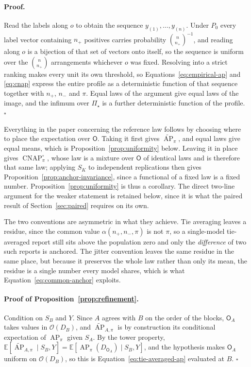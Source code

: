 \documentclass[11pt]{article}
\newcommand{\AP}{\operatorname{AP}}
\newcommand{\CNAP}{\operatorname{CNAP}}
\newcommand{\PSet}{\Pi_\star}
\newcommand{\E}{\mathbb{E}}
\newcommand{\APta}{\widetilde{\AP}}
\newcommand{\Rank}{\mathsf{O}}
\newcommand{\CNAPj}{\CNAP^{\circ}}
\theoremstyle{remark}
\begin{document}
\paragraph{Proof.}
Read the labels along $o$ to obtain the sequence $y_{(1)},\ldots,y_{(n)}$. Under $P_0$ every label vector containing $n_+$ positives carries probability $\binom{n}{n_+}^{-1}$, and reading along $o$ is a bijection of that set of vectors onto itself, so the sequence is uniform over the $\binom{n}{n_+}$ arrangements whichever $o$ was fixed. Resolving into a strict ranking makes every unit its own threshold, so Equations~\eqref{eq:empirical-ap} and \eqref{eq:cnap} express the entire profile as a deterministic function of that sequence together with $n_+$, $n_-$ and $\pi$. Equal laws of the argument give equal laws of the image, and the infimum over $\PSet$ is a further deterministic function of the profile. $\square$

Everything in the paper concerning the reference law follows by choosing where to place the expectation over $\Rank$. Taking it first gives $\APta_\pi$, and equal laws give equal means, which is Proposition~\ref{prop:uniformity} below. Leaving it in place gives $\CNAPj_\pi$, whose law is a mixture over $\Rank$ of identical laws and is therefore that same law; applying $S_K$ to independent replications then gives Proposition~\ref{prop:anchor-invariance}, since a functional of a fixed law is a fixed number. Proposition~\ref{prop:uniformity} is thus a corollary. The direct two-line argument for the weaker statement is retained below, since it is what the paired result of Section~\ref{sec:paired} requires on its own.

The two conventions are asymmetric in what they achieve. Tie averaging leaves a residue, since the common value $\alpha(n_+,n_-,\pi)$ is not $\pi$, so a single-model tie-averaged report still sits above the population zero and only the \emph{difference} of two such reports is anchored. The jitter convention leaves the same residue in the same place, but because it preserves the whole law rather than only its mean, the residue is a single number every model shares, which is what Equation~\eqref{eq:common-anchor} exploits.

\paragraph{Proof of Proposition~\ref{prop:refinement}.}
Condition on $S_B$ and $Y$. Since $A$ agrees with $B$ on the order of the blocks, $\Rank_A$ takes values in $\mathcal{O}(D_B)$, and $\APta_{A,\pi}$ is by construction its conditional expectation of $\AP_\pi$ given $S_A$. By the tower property, $\E[\APta_{A,\pi}\mid S_B,Y]=\E[\AP_\pi(D_{\Rank_A})\mid S_B,Y]$, and the hypothesis makes $\Rank_A$ uniform on $\mathcal{O}(D_B)$, so this is Equation~\eqref{eq:tie-averaged-ap} evaluated at $B$. $\square$
\end{document}
